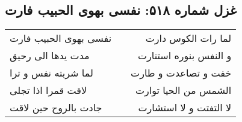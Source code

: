 \begin{center}
\section*{غزل شماره ۵۱۸: نفسی بهوی الحبیب فارت}
\label{sec:0518}
\begin{longtable}{l p{0.5cm} r}
نفسی بهوی الحبیب فارت
&&
لما رات الکوس دارت
\\
مدت یدها الی رحیق
&&
و النفس بنوره استنارت
\\
لما شربته نفس و ترا
&&
خفت و تصاعدت و طارت
\\
لاقت قمرا اذا تجلی
&&
الشمس من الحیا توارت
\\
جادت بالروح حین لاقت
&&
لا التفتت و لا استشارت
\\
\end{longtable}
\end{center}
